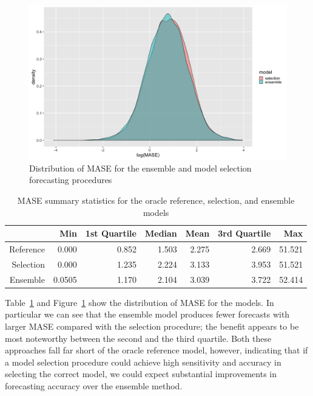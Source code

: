 \documentclass[11pt,3p,review,authoryear]{elsarticle}
\begin{document}
\begin{figure}[h]
\centering
\includegraphics[width=\textwidth]{distribution}
\caption{Distribution of MASE for the ensemble and model selection forecasting procedures}\label{fig:a}
\end{figure}

\begin{table}[ht]
\centering
{}
\begin{tabular}{rrrrrrr}
\hline
& Min & 1st Quartile & Median & Mean & 3rd Quartile & Max\\
\hline
Reference \vline & 0.000 & 0.852 & 1.503 & 2.275 & 2.669 & 51.521\\
Selection \vline & 0.000 & 1.235 & 2.224 & 3.133 & 3.953 & 51.521 \\
Ensemble \vline & 0.0505 & 1.170 & 2.104 & 3.039 & 3.722 & 52.414\\
\hline
\end{tabular}
\caption{MASE summary statistics for the oracle reference, selection, and ensemble models}\label{tab:a}
\end{table}


Table~\ref{tab:a} and Figure~\ref{fig:a} show the distribution of MASE for the models. In particular we can see that the ensemble model produces fewer forecasts with larger MASE compared with the selection procedure; the benefit appears to be most noteworthy between the second and the third quartile. Both these approaches fall far short of the oracle reference model, however, indicating that if a model selection procedure could achieve high sensitivity and accuracy in selecting the correct model, we could expect substantial improvements in forecasting accuracy over the ensemble method.
\end{document}
